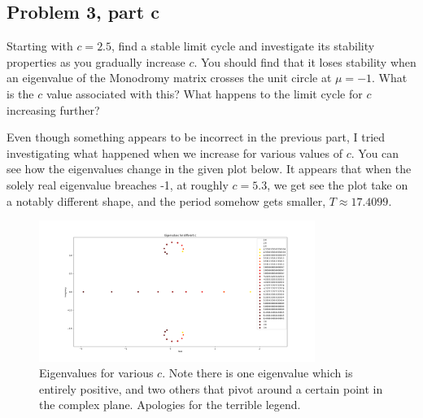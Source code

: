 \subsection{Problem 3, part c}
Starting with $c = 2.5$, find a stable limit cycle and investigate its stability properties
as you gradually increase $c$. You should find that it loses stability when an eigenvalue of the
Monodromy matrix crosses the unit circle at $\mu = -1$. What is the $c$ value associated with this? What happens to the limit cycle for $c$ increasing further?
\partbreak
\begin{solution}

    Even though something appears to be incorrect in the previous part, I tried investigating what happened when we increase for various values of $c$. You can see how the eigenvalues change in the given plot below. It appears that when the solely real eigenvalue breaches -1, at roughly $c = 5.3$, we get see the plot take on a notably different shape, and the period somehow gets smaller, $T \approx 17.4099$.
\end{solution}

\begin{figure}[h]
    \centering
    \includegraphics[width = 0.8\textwidth]{Images/eigvals plot.png}
    \caption{Eigenvalues for various $c$. Note there is one eigenvalue which is entirely positive, and two others that pivot around a certain point in the complex plane. Apologies for the terrible legend.}
    \label{fig:p3shit}
\end{figure}

